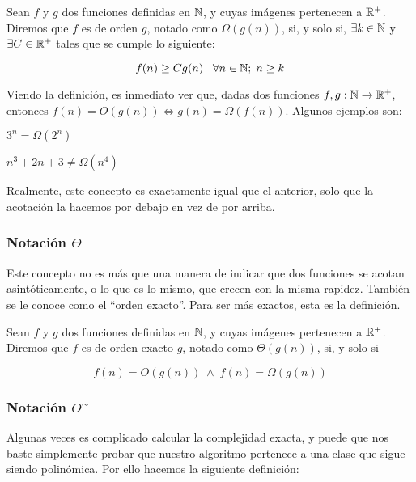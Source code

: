 \begin{definicion}
	Sean $f$ y $g$ dos funciones definidas en $\mathbb{N}$, y cuyas imágenes pertenecen a $\mathbb{R}^+$. Diremos que $f$ es de orden $g$, notado como $\Omega(g(n))$, si, y solo si, $\exists k \in \mathbb{N}$ y $\exists C \in \mathbb{R}^+$ tales que se cumple lo siguiente:
	
	$$f(n) \geq Cg(n) \;\;\;\forall n \in \mathbb{N};\; n \geq k$$
\end{definicion}

Viendo la definición, es inmediato ver que, dadas dos funciones $f,g:\mathbb{N} \to \mathbb{R}^+$, entonces $f(n) = O(g(n)) \Leftrightarrow g(n) = \Omega(f(n))$. Algunos ejemplos son:

\begin{ejemplo}
	$3^n = \Omega(2^n)$
\end{ejemplo}

\begin{ejemplo}
	$n^3 + 2n + 3 \neq \Omega(n^4)$
\end{ejemplo}

Realmente, este concepto es exactamente igual que el anterior, solo que la acotación la hacemos por debajo en vez de por arriba.

\subsubsection{Notación $\Theta$}

Este concepto no es más que una manera de indicar que dos funciones se acotan asintóticamente, o lo que es lo mismo, que crecen con la misma rapidez. También se le conoce como el ``orden exacto''. Para ser más exactos, esta es la definición.

\begin{definicion}
	Sean $f$ y $g$ dos funciones definidas en $\mathbb{N}$, y cuyas imágenes pertenecen a $\mathbb{R}^+$. Diremos que $f$ es de orden exacto $g$, notado como $\Theta(g(n))$, si, y solo si
	
	$$f(n) = O(g(n))\;\wedge\;f(n) = \Omega(g(n))$$
\end{definicion}

\subsubsection{Notación $O^\sim$}

Algunas veces es complicado calcular la complejidad exacta, y puede que nos baste simplemente probar que nuestro algoritmo pertenece a una clase que sigue siendo polinómica. Por ello hacemos la siguiente definición:

